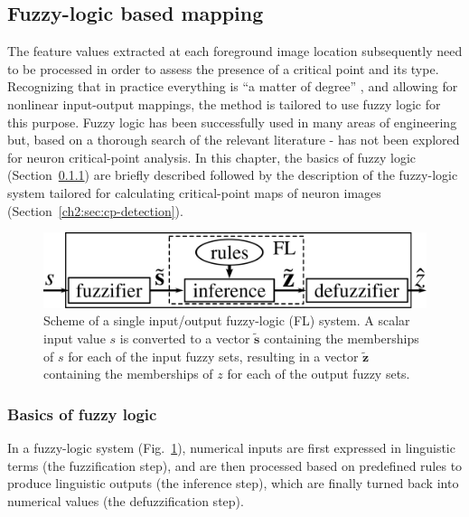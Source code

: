 \subsection{Fuzzy-logic based mapping}
\label{ch2:subsec:flrb-detection} %
The feature values extracted at each foreground image location subsequently need to be processed in order to assess the presence of a critical point and its type. Recognizing that in practice everything is ``a matter of degree'' \cite{zadeh1975fuzzy}, and allowing for nonlinear input-output mappings, the method is tailored to use fuzzy logic for this purpose. Fuzzy logic has been successfully used in many areas of engineering \cite{mendel1995fuzzy} but, based on a thorough search of the relevant literature - has not been explored for neuron critical-point analysis. In this chapter, the basics of fuzzy logic (Section~\ref{ch2:sec:FL}) are briefly described followed by the description of the fuzzy-logic system tailored for calculating critical-point maps of neuron images (Section~\ref{ch2:sec:cp-detection}).
\begin{figure}
	\centering
	\includegraphics[width=0.5\columnwidth]{fig5}
	\caption{Scheme of a single input/output fuzzy-logic (FL) system. A scalar input value $s$ is converted to a vector $\tilde{\mathbf{s}}$ containing the memberships of $s$ for each of the input fuzzy sets, resulting in a vector $\tilde{\mathbf{z}}$ containing the memberships of $z$ for each of the output fuzzy sets.}
	\label{ch2_fig5}
\end{figure}
\subsubsection{Basics of fuzzy logic}
\label{ch2:sec:FL}
In a fuzzy-logic system (Fig.~\ref{ch2_fig5}), numerical inputs are first expressed in linguistic terms (the fuzzification step), and are then processed based on predefined rules to produce linguistic outputs (the inference step), which are finally turned back into numerical values (the defuzzification step).
